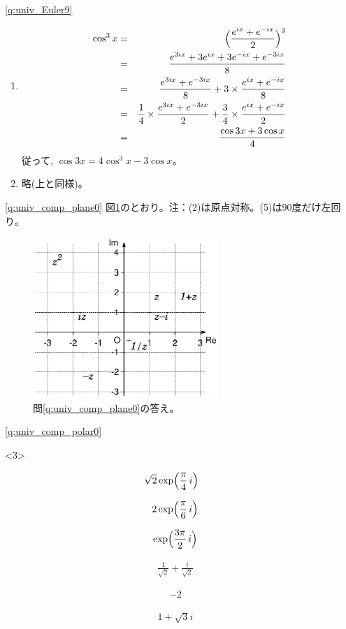 \ref{q:univ_Euler9} 
\begin{enumerate}
\item 
\begin{eqnarray*}
\cos^3 x&=&\Bigl(\frac{e^{ix}+e^{-ix}}{2}\Bigr)^3\\
&=&\frac{e^{3ix}+3e^{ix}+3e^{-ix}+e^{-3ix}}{8}\\
&=&\frac{e^{3ix}+e^{-3ix}}{8}+3\times\frac{e^{ix}+e^{-ix}}{8}\\
&=&\frac{1}{4}\times\frac{e^{3ix}+e^{-3ix}}{2}+\frac{3}{4}\times\frac{e^{ix}+e^{-ix}}{2}\\
&=&\frac{\cos3x+3\cos x}{4}
\end{eqnarray*}
従って, $\cos 3x=4\cos^3 x-3\cos x$。
\item 略(上と同様)。
\end{enumerate}
\mv

\ref{q:univ_comp_plane0}  図\ref{fig:cplane1}のとおり。注：(2)は原点対称。(5)は90度だけ左回り。
\begin{figure}[h]
    \centering
    \includegraphics[width=7cm]{cplane1.eps}
    \caption{問\ref{q:univ_comp_plane0}の答え。}\label{fig:cplane1}
\end{figure}

%
\ref{q:univ_comp_polar0}  
\begin{edaenumerate}<3>
\item \begin{eqnarray*}\sqrt{2}\exp \Bigl(\frac{\pi}{4}\,i\Bigr)\,\,\,\,\,\,\,\,\,\,\,\,\end{eqnarray*}
\item \begin{eqnarray*}2\exp \Bigl(\frac{\pi}{6}\,i\Bigr)\,\,\,\,\,\,\,\end{eqnarray*}
\item \begin{eqnarray*}\exp \Bigl(\frac{3\pi}{2}\,i\Bigr)\,\,\,\,\,\,\,\end{eqnarray*}
\item \begin{eqnarray*}\frac{1}{\sqrt{2}}+\frac{i}{\sqrt{2}}\,\,\,\,\,\,\,\end{eqnarray*}
\item \begin{eqnarray*}-2\,\,\,\,\,\,\,\end{eqnarray*}
\item \begin{eqnarray*}1+\sqrt{3}i\,\,\,\,\,\,\,\end{eqnarray*}
\end{edaenumerate}
\hv

